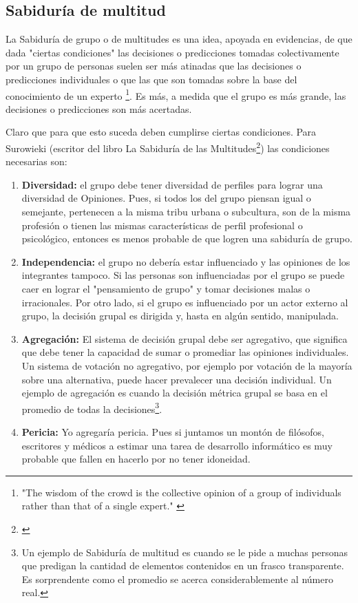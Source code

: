 \subsection{Sabiduría de multitud}

La Sabiduría de grupo o de multitudes es una idea, apoyada en evidencias, de que dada "ciertas condiciones" las decisiones o predicciones tomadas colectivamente por un grupo de personas suelen ser más atinadas que las decisiones o predicciones individuales o que las que son tomadas sobre la base del conocimiento de un experto \cite{James-Surowiecki-2005}\footnote{"The wisdom of the crowd is the collective opinion of a group of individuals rather than that of a single expert." \cite{MIT-Press-2009}}. Es más, a medida que el grupo es más grande, las decisiones o predicciones son más acertadas.

Claro que para que esto suceda deben cumplirse ciertas condiciones. Para Surowieki (escritor del libro La Sabiduría de las Multitudes\footnote{\cite{James-Surowiecki-2005}}) las condiciones necesarias son:

\begin{enumerate}

\item \textbf{Diversidad:} el grupo debe tener diversidad de perfiles para lograr una diversidad de Opiniones. Pues, si todos los del grupo piensan igual o semejante, pertenecen a la misma tribu urbana o subcultura, son de la misma profesión o tienen las mismas características de perfil profesional o psicológico, entonces es menos probable de que logren una sabiduría de grupo.

\item \textbf{Independencia:} el grupo no debería estar influenciado y las opiniones de los integrantes tampoco. Si las personas son influenciadas por el grupo se puede caer en lograr el "pensamiento de grupo" y tomar decisiones malas o irracionales. Por otro lado, si el grupo es influenciado por un actor externo al grupo, la decisión grupal es dirigida y, hasta en algún sentido, manipulada.

\item \textbf{Agregación:} El sistema de decisión grupal debe ser agregativo, que significa que debe tener la capacidad de sumar o promediar las opiniones individuales. Un sistema de votación no agregativo, por ejemplo por votación de la mayoría sobre una alternativa, puede hacer prevalecer una decisión individual. Un ejemplo de agregación es cuando la decisión métrica grupal se basa en el promedio de todas la decisiones\footnote{Un ejemplo de Sabiduría de multitud es cuando se le pide a muchas personas que predigan la cantidad de elementos contenidos en un frasco transparente. Es sorprendente como el promedio se acerca considerablemente al número real.}.


\item \textbf{Pericia:} Yo agregaría pericia. Pues si juntamos un montón de filósofos, escritores y médicos a estimar una tarea de desarrollo informático es muy probable que fallen en hacerlo por no tener idoneidad.
 

\end{enumerate}

